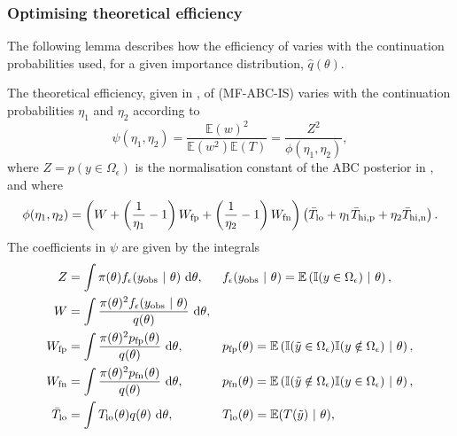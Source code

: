 \documentclass[review]{siamonline190516}
\begin{document}
\subsubsection{Optimising theoretical efficiency}
\label{s:eta:exact}

The following lemma describes how the efficiency of  varies with the continuation probabilities used, for a given importance distribution, $\hat q(\theta)$. 

\begin{lemma}
\label{lemma:phi}
The theoretical efficiency, given in , of  (MF-ABC-IS) varies with the continuation probabilities $\eta_1$ and $\eta_2$ according to
\[
\psi(\eta_1,\eta_2) = \frac{\mathbb E(w)^2}{\mathbb E(w^2) \mathbb E(T)} = \frac{Z^2}{\phi(\eta_1, \eta_2)},
\]
where $Z = p(y \in \Omega_\epsilon)$ is the normalisation constant of the ABC posterior in , and where
\begin{equation}
\label{eq:Phi}
\phi(\eta_1, \eta_2) = 
\left(  W + \left( \frac{1}{\eta_1} - 1 \right) \fp W + \left( \frac{1}{\eta_2} - 1 \right) \fn W \right)
\left( \bar{T}_{\mathrm{lo}}
 + \eta_1 \bar T_{\mathrm{hi}, \mathrm p}
 + \eta_2 \bar T_{\mathrm{hi}, \mathrm n} \right).
\end{equation}
The coefficients in $\psi$ are given by the integrals
\begin{subequations}
\label{eq:PhiComponents}
\begin{align}
\label{eq:Z}
Z &= \int \pi(\theta) f_\epsilon(\obs y~|~\theta) ~\mathrm d\theta
,&
&f_\epsilon(\obs y~|~\theta) = \mathbb E \left(\mathbb I(y \in \Omega_\epsilon) ~|~\theta \right) 
,\\
W &= \int \frac{\pi(\theta)^2 f_\epsilon(\obs y~|~\theta)}{q(\theta)} ~\mathrm d\theta
,\\
\fp W &= \int \frac{\pi(\theta)^2 \fp p(\theta)}{q(\theta)} ~\mathrm d\theta 
,&
&\fp p(\theta) = \mathbb E \left(\mathbb I ( \tilde y \in \Omega_\epsilon) \mathbb I(y \notin \Omega_\epsilon) ~|~\theta \right) 
,\\
\fn W &= \int \frac{\pi(\theta)^2 \fn p(\theta)}{q(\theta)} ~\mathrm d\theta 
,&
&\fn p(\theta) = \mathbb E \left(\mathbb I ( \tilde y \notin \Omega_\epsilon) \mathbb I(y \in \Omega_\epsilon) ~|~\theta \right) 
,\\
\bar T_{\mathrm{lo}} &= \int T_{\mathrm{lo}}(\theta) q(\theta) ~\mathrm d\theta
,&
&T_{\mathrm{lo}}(\theta) = \mathbb E(T(\tilde y) ~|~\theta)
,\\

\end{align}
\end{subequations}
\end{lemma}
\end{document}
